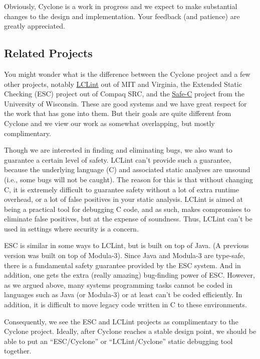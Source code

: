 Obviously, Cyclone is a work in progress and we expect to make
substantial changes to the design and implementation.  Your feedback
(and patience) are greatly appreciated.

\subsection{Related Projects}

You might wonder what is the difference between the Cyclone project
and a few other projects, notably
\href{http://lclint.cs.virginia.edu/}{LCLint} out of MIT and Virginia,
the Extended Static Checking (ESC) project out of Compaq SRC, and the
\href{http://www.cs.wisc.edu/~austin/scc.html}{Safe-C} project from
the University of Wisconsin.  These are good systems and we have great
respect for the work that has gone into them.  But their goals are
quite different from Cyclone and we view our work as somewhat
overlapping, but mostly complimentary.

Though we are interested in finding and eliminating bugs, we also want
to guarantee a certain level of safety. LCLint can't provide such a
guarantee, because the underlying language (C) and associated static
analyses are unsound (i.e., some bugs will not be caught). The reason
for this is that without changing C, it is extremely difficult to
guarantee safety without a lot of extra runtime overhead, or a lot of
false positives in your static analysis. LCLint is aimed at being a
practical tool for debugging C code, and as such, makes compromises to
eliminate false positives, but at the expense of soundness. Thus,
LCLint can't be used in settings where security is a concern.

ESC is similar in some ways to LCLint, but is built on top of Java. (A
previous version was built on top of Modula-3). Since Java and
Modula-3 are type-safe, there is a fundamental safety guarantee
provided by the ESC system. And in addition, one gets the extra
(really amazing) bug-finding power of ESC\@. However, as we argued
above, many systems programming tasks cannot be coded in languages
such as Java (or Modula-3) or at least can't be coded efficiently. In
addition, it is difficult to move legacy code written in C to these
environments.

Consequently, we see the ESC and LCLint projects as complimentary to
the Cyclone project. Ideally, after Cyclone reaches a stable design
point, we should be able to put an ``ESC/Cyclone'' or
``LCLint/Cyclone'' static debugging tool together.

